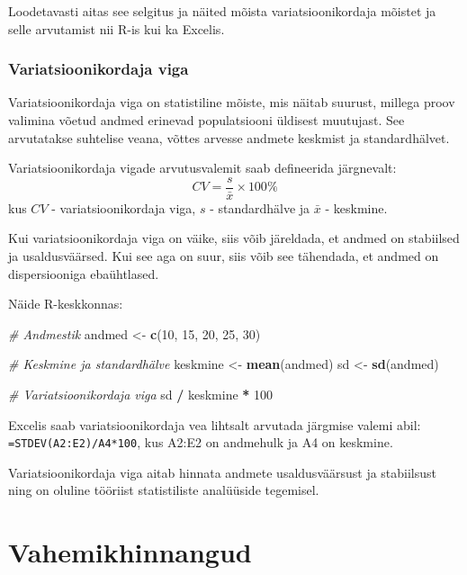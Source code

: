 \documentclass[
]{book}
\newenvironment{Shaded}{\begin{snugshade}}{\end{snugshade}}
\newcommand{\CommentTok}[1]{\textcolor[rgb]{0.56,0.35,0.01}{\textit{#1}}}
\newcommand{\DecValTok}[1]{\textcolor[rgb]{0.00,0.00,0.81}{#1}}
\newcommand{\FunctionTok}[1]{\textcolor[rgb]{0.13,0.29,0.53}{\textbf{#1}}}
\newcommand{\NormalTok}[1]{#1}
\newcommand{\OtherTok}[1]{\textcolor[rgb]{0.56,0.35,0.01}{#1}}
\newcommand{\SpecialCharTok}[1]{\textcolor[rgb]{0.81,0.36,0.00}{\textbf{#1}}}
\renewenvironment{Shaded} {\begin{snugshade}\footnotesize} {\end{snugshade}}
\begin{document}
Loodetavasti aitas see selgitus ja näited mõista variatsioonikordaja mõistet ja selle arvutamist nii R-is kui ka Excelis.

\subsubsection{Variatsioonikordaja viga}\label{variatsioonikordaja-viga}

Variatsioonikordaja viga on statistiline mõiste, mis näitab suurust, millega proov valimina võetud andmed erinevad populatsiooni üldisest muutujast. See arvutatakse suhtelise veana, võttes arvesse andmete keskmist ja standardhälvet.

Variatsioonikordaja vigade arvutusvalemit saab defineerida järgnevalt:
\[ CV = \frac{s}{\bar{x}} \times 100\% \]
kus
\(CV\) - variatsioonikordaja viga,
\(s\) - standardhälve ja
\(\bar{x}\) - keskmine.

Kui variatsioonikordaja viga on väike, siis võib järeldada, et andmed on stabiilsed ja usaldusväärsed. Kui see aga on suur, siis võib see tähendada, et andmed on dispersiooniga ebaühtlased.

Näide R-keskkonnas:

\begin{Shaded}
\begin{Highlighting}[]
\CommentTok{\# Andmestik}
\NormalTok{andmed }\OtherTok{\textless{}{-}} \FunctionTok{c}\NormalTok{(}\DecValTok{10}\NormalTok{, }\DecValTok{15}\NormalTok{, }\DecValTok{20}\NormalTok{, }\DecValTok{25}\NormalTok{, }\DecValTok{30}\NormalTok{)}

\CommentTok{\# Keskmine ja standardhälve}
\NormalTok{keskmine }\OtherTok{\textless{}{-}} \FunctionTok{mean}\NormalTok{(andmed)}
\NormalTok{sd }\OtherTok{\textless{}{-}} \FunctionTok{sd}\NormalTok{(andmed)}

\CommentTok{\# Variatsioonikordaja viga}
\NormalTok{sd }\SpecialCharTok{/}\NormalTok{ keskmine }\SpecialCharTok{*} \DecValTok{100}
\end{Highlighting}
\end{Shaded}

Excelis saab variatsioonikordaja vea lihtsalt arvutada järgmise valemi abil: \texttt{=STDEV(A2:E2)/A4*100}, kus A2:E2 on andmehulk ja A4 on keskmine.

Variatsioonikordaja viga aitab hinnata andmete usaldusväärsust ja stabiilsust ning on oluline tööriist statistiliste analüüside tegemisel.

\section{Vahemikhinnangud}\label{vahemikhinnangud}
\end{document}
